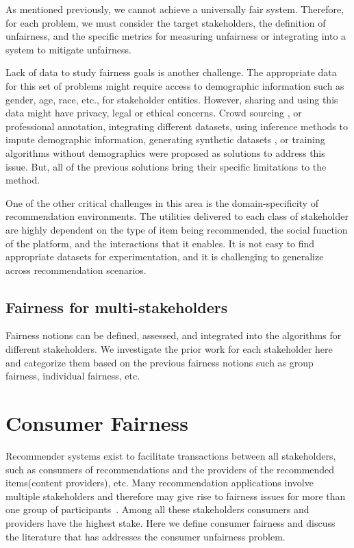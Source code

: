             As mentioned previously, we cannot achieve a universally fair system. Therefore, for each problem, we must consider the target stakeholders, the definition of unfairness, and the specific metrics for measuring unfairness or integrating into a system to mitigate unfairness.

            Lack of data to study fairness goals is another challenge. The appropriate data for this set of problems might require access to demographic information such as gender, age, race, etc., for stakeholder entities. However, sharing and using this data might have privacy, legal or ethical concerns. Crowd sourcing \cite{biega2020overview}, or professional annotation, integrating different datasets, using inference methods to impute demographic information, generating synthetic datasets \cite{burke2018synthetic}, or training algorithms without demographics\cite{Kallus2020Assessing} were proposed as solutions to address this issue. But, all of the previous solutions bring their specific limitations to the method. 

            One of the other critical challenges in this area is the domain-specificity of recommendation environments. The utilities delivered to each class of stakeholder are highly dependent on the type of item being recommended, the social function of the platform, and the interactions that it enables. It is not easy to find appropriate datasets for experimentation, and it is challenging to generalize across recommendation scenarios.
        
    \subsection{Fairness for multi-stakeholders}
    
        Fairness notions can be defined, assessed, and integrated into the algorithms for different stakeholders. We investigate the prior work for each stakeholder here and categorize them based on the previous fairness notions such as group fairness, individual fairness, etc.






\section{Consumer Fairness}
\label{sec:fairness_cf}

    Recommender systems exist to facilitate transactions between all stakeholders, such as consumers of recommendations and the providers of the recommended items(content providers), etc. Many recommendation applications involve multiple stakeholders and therefore may give rise to fairness issues for more than one group of participants~\cite{burke_multisided_2017}. Among all these stakeholders consumers and providers have the highest stake. Here we  define consumer fairness and discuss the literature that has addresses the consumer unfairness problem.

